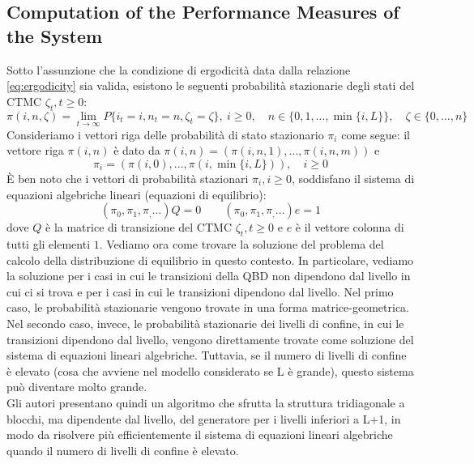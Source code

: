 \documentclass[11pt]{article}
\begin{document}
\subsection{Computation of the Performance Measures of the System}

Sotto l'assunzione che la condizione di ergodicità data dalla relazione \ref{eq:ergodicity} sia valida, esistono le seguenti probabilità stazionarie degli stati del CTMC $\zeta_t, t \geq 0$:
\begin{equation}
    \pi(i,n,\zeta) = \lim_{t \to \infty} P\{i_t = i, n_t = n, \zeta_t = \zeta\}, ~ i \geq 0, \quad n \in \{0, 1, \dots , \min\{i,L\}\}, \quad \zeta \in \{0, \dots, n\}
\end{equation}
Consideriamo i vettori riga delle probabilità di stato stazionario $\pi_i$ come segue: il vettore riga $\pi(i,n)$ è dato da $\pi(i,n) = (\pi(i,n,1), ..., \pi(i,n,m))$ e
\begin{equation}
    \pi_i = (\pi(i,0), ..., \pi(i, \min \{i,L\})), \quad i \geq 0
\end{equation}
È ben noto che i vettori di probabilità stazionari $\pi_i, i \geq 0$, soddisfano il sistema di equazioni algebriche lineari (equazioni di equilibrio):
\begin{equation}
    (\pi_0, \pi_1, \pi_, \dots)Q = 0 \qquad (\pi_0, \pi_1, \pi_, \dots)e = 1
\end{equation}
dove $Q$ è la matrice di transizione del CTMC $\zeta_t, t \geq 0$ e $e$ è il vettore colonna di tutti gli elementi $1$. Vediamo ora come trovare la soluzione del problema del calcolo della distribuzione di equilibrio in questo contesto. In particolare, vediamo la soluzione per i casi in cui le transizioni della QBD non dipendono dal livello in cui ci si trova e per i casi in cui le transizioni dipendono dal livello. Nel primo caso, le probabilità stazionarie vengono trovate in una forma matrice-geometrica. Nel secondo caso, invece, le probabilità stazionarie dei livelli di confine, in cui le transizioni dipendono dal livello, vengono direttamente trovate come soluzione del sistema di equazioni lineari algebriche. Tuttavia, se il numero di livelli di confine è elevato (cosa che avviene nel modello considerato se L è grande), questo sistema può diventare molto grande. \\

Gli autori presentano quindi un algoritmo che sfrutta la struttura tridiagonale a blocchi, ma dipendente dal livello, del generatore per i livelli inferiori a L+1, in modo da risolvere più efficientemente il sistema di equazioni lineari algebriche quando il numero di livelli di confine è elevato. \\
\end{document}
